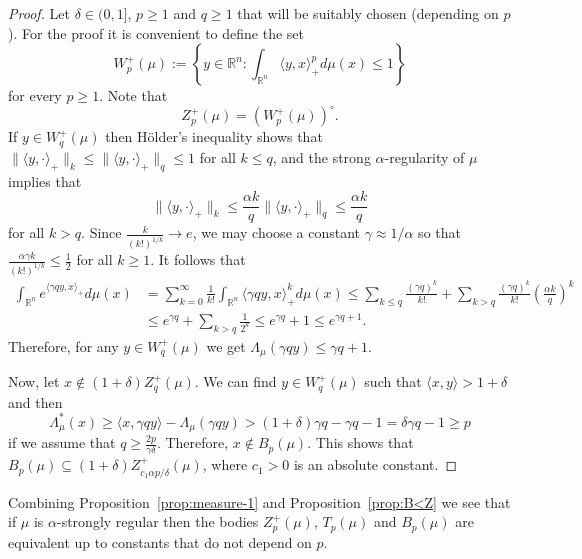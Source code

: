 \documentclass[11pt,leqno]{article}
\theoremstyle{definition}
\theoremstyle{remark}
\numberwithin{equation}{section}
\newcommand{\ls}{\leqslant}
\newcommand{\gr}{\geqslant}
\newcommand{\1}{\textbf{1}}
\begin{document}
\begin{proof}Let $\delta \in (0,1]$, $p\gr 1$ and $q\gr 1$ that will be suitably chosen
(depending on $p$). For the proof it is convenient to define the set
\begin{equation*}W^+_p(\mu) := \left\{y\in {\mathbb R}^n : \int_{{\mathbb R}^n} \langle y, x\rangle_+^pd\mu(x)\ls 1\right\}\end{equation*}
for every $p\gr 1$. Note that
\begin{equation*}Z^+_p(\mu) = (W^+_p(\mu))^{\circ}.\end{equation*}
If $y\in W^+_q(\mu)$ then H\"{o}lder's inequality shows that
$\|\langle y,\cdot\rangle_+\|_k\ls \|\langle y,\cdot\rangle_+\|_q\ls 1$ for all $k\ls q$, and the
strong $\alpha $-regularity of $\mu$ implies that
$$\|\langle y,\cdot\rangle_+\|_k\ls \frac{\alpha k}{q}\|\langle y,\cdot\rangle_+\|_q\ls \frac{\alpha k}{q}$$
for all $k>q$. Since $\frac{k}{(k!)^{1/k}}\to e$, we may choose a constant $\gamma\approx 1/\alpha $ so
that $\frac{\alpha \gamma k}{(k!)^{1/k}}\ls\frac{1}{2}$ for all $k\gr 1$.  It follows that
\begin{align*}
\int_{{\mathbb R}^n} e^{\langle \gamma qy,x\rangle_+}d\mu(x)
&=\sum_{k=0}^{\infty}\frac{1}{k!}\int_{{\mathbb R}^n}\langle \gamma qy, x\rangle_+^kd\mu(x)
\ls \sum_{k\ls q}\frac{(\gamma q)^k}{k!}+\sum_{k>q}\frac{(\gamma q)^k}{k!}\left (\frac{\alpha k}{q}\right )^k\\
&\ls e^{\gamma q}+\sum_{k>q}\frac{1}{2^k}\ls e^{\gamma q}+1\ls e^{\gamma q+1}.\end{align*}
Therefore, for any $y\in W^+_q(\mu)$ we get $\Lambda_{\mu}(\gamma qy)\ls\gamma q+1$.

Now, let $x\notin (1+\delta)Z^+_q(\mu)$. We can find $y\in W^+_q(\mu)$ such that $\langle x,y\rangle> 1+\delta $ and then
\begin{equation*}\Lambda^{\ast }_{\mu }(x) \gr \langle x,\gamma qy\rangle
-\Lambda_{\mu }(\gamma qy)> (1+\delta)\gamma q -\gamma q-1=\delta\gamma q-1 \gr p\end{equation*}
if we assume that $q\gr \frac{2p}{\gamma\delta}$. Therefore, $x\notin
B_p(\mu )$. This shows that $B_p(\mu)\subseteq (1+\delta)Z^+_{c_1\alpha p/\delta} (\mu)$, where $c_1>0$
is an absolute constant. \end{proof}

Combining Proposition~\ref{prop:measure-1} and Proposition~\ref{prop:B<Z} we see that if $\mu$ is
$\alpha $-strongly regular then the bodies $Z_p^+(\mu)$, $T_p(\mu)$
and $B_p(\mu)$ are equivalent up to constants that do not depend on $p$.
\end{document}
